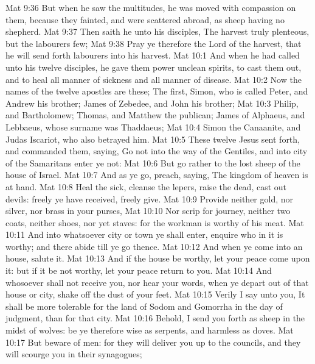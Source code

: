 \vs Mat 9:36 But when he saw the multitudes, he was moved with compassion on them, because they fainted, and were scattered abroad, as sheep having no shepherd.
\vs Mat 9:37 Then saith he unto his disciples, The harvest truly  plenteous, but the labourers  few;
\vs Mat 9:38 Pray ye therefore the Lord of the harvest, that he will send forth labourers into his harvest.
\vs Mat 10:1 And when he had called unto  his twelve disciples, he gave them power  unclean spirits, to cast them out, and to heal all manner of sickness and all manner of disease.
\vs Mat 10:2 Now the names of the twelve apostles are these; The first, Simon, who is called Peter, and Andrew his brother; James  of Zebedee, and John his brother;
\vs Mat 10:3 Philip, and Bartholomew; Thomas, and Matthew the publican; James  of Alphaeus, and Lebbaeus, whose surname was Thaddaeus;
\vs Mat 10:4 Simon the Canaanite, and Judas Iscariot, who also betrayed him.
\vs Mat 10:5 These twelve Jesus sent forth, and commanded them, saying, Go not into the way of the Gentiles, and into  city of the Samaritans enter ye not:
\vs Mat 10:6 But go rather to the lost sheep of the house of Israel.
\vs Mat 10:7 And as ye go, preach, saying, The kingdom of heaven is at hand.
\vs Mat 10:8 Heal the sick, cleanse the lepers, raise the dead, cast out devils: freely ye have received, freely give.
\vs Mat 10:9 Provide neither gold, nor silver, nor brass in your purses,
\vs Mat 10:10 Nor scrip for  journey, neither two coats, neither shoes, nor yet staves: for the workman is worthy of his meat.
\vs Mat 10:11 And into whatsoever city or town ye shall enter, enquire who in it is worthy; and there abide till ye go thence.
\vs Mat 10:12 And when ye come into an house, salute it.
\vs Mat 10:13 And if the house be worthy, let your peace come upon it: but if it be not worthy, let your peace return to you.
\vs Mat 10:14 And whosoever shall not receive you, nor hear your words, when ye depart out of that house or city, shake off the dust of your feet.
\vs Mat 10:15 Verily I say unto you, It shall be more tolerable for the land of Sodom and Gomorrha in the day of judgment, than for that city.
\vs Mat 10:16 Behold, I send you forth as sheep in the midst of wolves: be ye therefore wise as serpents, and harmless as doves.
\vs Mat 10:17 But beware of men: for they will deliver you up to the councils, and they will scourge you in their synagogues;
